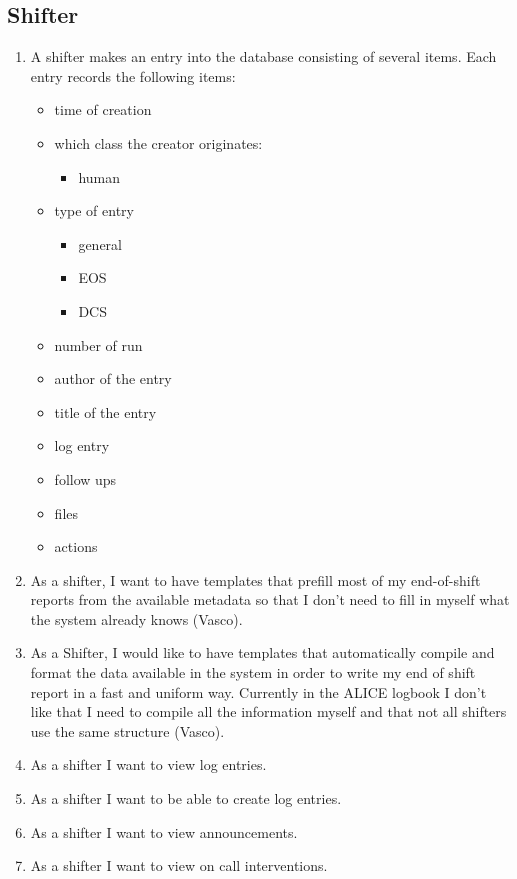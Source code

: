 \subsection{Shifter}
\begin{enumerate}
  \item A shifter makes an entry into the database consisting of several items. Each entry records the following items:
  \begin{itemize}
    \item time of creation
    \item which class the creator originates:
    \begin{itemize}
      \item human
    \end{itemize}
    \item type of entry
    \begin{itemize}
      \item general
      \item EOS
      \item DCS
    \end{itemize}
    \item number of run
    \item author of the entry
    \item title of the entry
    \item log entry
    \item follow ups
    \item files
    \item actions
  \end{itemize}
  \item As a shifter, I want to have templates that prefill most of my end-of-shift reports from the available metadata so that I don’t need to fill in myself what the system already knows (Vasco).
  \item As a Shifter, I would like to have templates that automatically compile and format the data available in the system in order to write my end of shift report in a fast and uniform way. Currently in the ALICE logbook I don't like that I need to compile all the information myself and that not all shifters use the same structure (Vasco).
  \item As a shifter I want to view log entries.
  \item As a shifter I want to be able to create log entries.
  \item As a shifter I want to view announcements.
  \item As a shifter I want to view on call interventions.

\end{enumerate}
